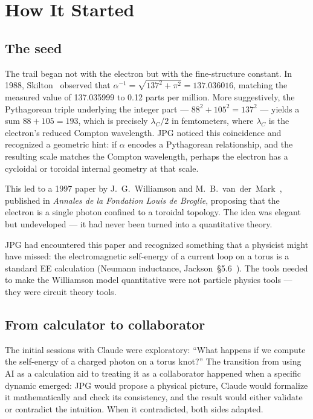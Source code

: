 \documentclass[11pt,a4paper]{article}
\begin{document}
\section{How It Started}
\label{sec:origin}

\subsection{The seed}

The trail began not with the electron but with the fine-structure constant. In 1988, Skilton~\cite{skilton1988} observed that $\alpha^{-1} = \sqrt{137^2 + \pi^2} = 137.036016$, matching the measured value of 137.035999 to 0.12 parts per million. More suggestively, the Pythagorean triple underlying the integer part --- $88^2 + 105^2 = 137^2$ --- yields a sum $88 + 105 = 193$, which is precisely $\lambda_C / 2$ in femtometers, where $\lambda_C$ is the electron's reduced Compton wavelength. JPG noticed this coincidence and recognized a geometric hint: if $\alpha$ encodes a Pythagorean relationship, and the resulting scale matches the Compton wavelength, perhaps the electron has a cycloidal or toroidal internal geometry at that scale.

This led to a 1997 paper by J.~G.~Williamson and M.~B.~van~der~Mark~\cite{williamson1997}, published in \emph{Annales de la Fondation Louis de Broglie}, proposing that the electron is a single photon confined to a toroidal topology. The idea was elegant but undeveloped --- it had never been turned into a quantitative theory.

JPG had encountered this paper and recognized something that a physicist might have missed: the electromagnetic self-energy of a current loop on a torus is a standard EE calculation (Neumann inductance, Jackson~\S5.6~\cite{jackson1999}). The tools needed to make the Williamson model quantitative were not particle physics tools --- they were circuit theory tools.

\subsection{From calculator to collaborator}

The initial sessions with Claude were exploratory: ``What happens if we compute the self-energy of a charged photon on a torus knot?'' The transition from using AI as a calculation aid to treating it as a collaborator happened when a specific dynamic emerged: JPG would propose a physical picture, Claude would formalize it mathematically and check its consistency, and the result would either validate or contradict the intuition. When it contradicted, both sides adapted.
\end{document}
